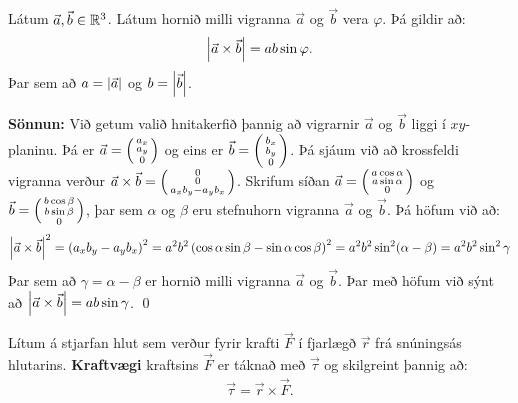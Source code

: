\begin{tcolorbox}
\begin{setning}
Látum $\Vec{a}, \Vec{b} \in \mathbb{R}^3$. Látum hornið milli vigranna $\Vec{a}$ og $\Vec{b}$ vera $\varphi$. Þá gildir að:
\begin{align*}
    \abs{\Vec{a} \times \Vec{b}} = ab\sin\varphi.
\end{align*}
Þar sem að $a = \abs{\Vec{a}}$ og $b = \abs{\Vec{b}}$.
\end{setning}
\end{tcolorbox}

\textbf{Sönnun:} Við getum valið hnitakerfið þannig að vigrarnir $\Vec{a}$ og $\Vec{b}$ liggi í $xy$-planinu. Þá er $\Vec{a} = \smqty(a_x \\ a_y \\ 0)$ og eins er $\Vec{b} = \smqty(b_x \\ b_y \\ 0)$. Þá sjáum við að krossfeldi vigranna verður $\Vec{a} \times \Vec{b} = \smqty(0 \\ 0 \\ a_x b_y - a_y b_x)$. Skrifum síðan $\Vec{a} = \smqty(a\cos\alpha \\ a\sin\alpha \\ 0)$ og $\Vec{b} = \smqty(b\cos\beta \\ b\sin\beta \\ 0)$, þar sem $\alpha$ og $\beta$ eru stefnuhorn vigranna $\vec{a}$ og $\vec{b}$. Þá höfum við að:
\begin{align*}
    \abs{\Vec{a}\times \Vec{b}}^2 = \left(a_xb_y - a_y b_x\right)^2  = a^2b^2 \left( \cos\alpha \sin\beta - \sin\alpha \cos\beta \right)^2 = a^2b^2 \sin^2(\alpha - \beta) = a^2b^2\sin^2\gamma
\end{align*}
Þar sem að $\gamma = \alpha - \beta$ er hornið milli vigranna $\Vec{a}$ og $\Vec{b}$. Þar með höfum við sýnt að $\abs{\Vec{a}\times \Vec{b}} = ab\sin\gamma$. \qed


\begin{tcolorbox}
\begin{definition}
Lítum á stjarfan hlut sem verður fyrir krafti $\vec{F}$ í fjarlægð $\vec{r}$ frá snúningsás hlutarins. \textbf{Kraftvægi} kraftsins $\vec{F}$ er táknað með $\vec{\tau}$ og skilgreint þannig að:
\begin{align*}
    \vec{\tau} = \vec{r} \times \vec{F}.
\end{align*}
\end{definition}
\end{tcolorbox}

